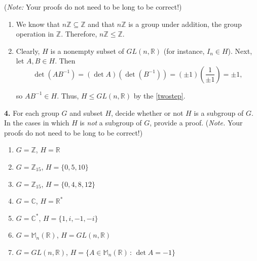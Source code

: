 \documentclass[10pt,]{book}
\theoremstyle{plain}
\theoremstyle{definition}
\theoremstyle{definition}
\theoremstyle{definition}
\theoremstyle{definition}
\numberwithin{equation}{section}
\def\Z{\mathbb{Z}}
\def\R{\mathbb{R}}
\def\C{\mathbb{C}}
\def\M{\mathbb{M}}
\begin{document}
\par

        (\emph{Note:} Your proofs do not need to be long to be correct!)
\par\smallskip
\leavevmode%
\begin{enumerate}[label=(\alph*)]
\item\hypertarget{li-227}{}
          We know that \(n\Z\subseteq \Z\) and that \(n\Z\) is a group under addition, the group operation in \(\Z\).  Therefore, \(n\Z\leq \Z\).
\item\hypertarget{li-228}{}
          Clearly, \(H\) is a nonempty subset of \(GL(n,\R)\) (for instance, \(I_n\in H\)).  Next, let \(A,B\in H\).
          Then
\begin{equation*}

            \det(AB^{-1})=(\det A)(\det (B^{-1}))=(\pm 1)\left(\frac{1}{\pm 1}\right)=\pm 1,
          
\end{equation*}

          so \(AB^{-1}\in H\).  Thus, \(H\leq GL(n,\R)\) by the \hyperref[twostep]{\ref{twostep}}.
\end{enumerate}
\par\smallskip
\noindent\textbf{4.}\quad{}
        For each group \(G\) and subset \(H\), decide whether or not \(H\) is a subgroup of \(G\). In the cases in which \(H\) is \emph{not} a subgroup of \(G\), provide a proof. (\emph{Note.} Your proofs do not need to be long to be correct!)
        \leavevmode%
\begin{enumerate}[label=(\alph*)]
\item\hypertarget{li-229}{}
              \(G=\Z\), \(H=\R\)
\item\hypertarget{li-230}{}
              \(G=\Z_{15}\), \(H=\{0,5,10\}\)
\item\hypertarget{li-231}{}
              \(G=\Z_{15}\), \(H=\{0,4,8,12\}\)
\item\hypertarget{li-232}{}
              \(G=\C\), \(H=\R^*\)
\item\hypertarget{li-233}{}
              \(G=\C^*\), \(H=\{1,i,-1,-i\}\)
\item\hypertarget{li-234}{}
              \(G=\M_n(\R)\), \(H=GL(n,\R)\)
\item\hypertarget{li-235}{}
              \(G=GL(n,\R)\), \(H=\{A\in \M_n(\R)\,:\,\det A = -1\}\)
\end{enumerate}
\end{document}
